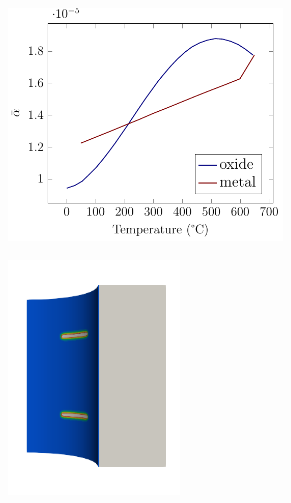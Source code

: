 \begin{frame}
\begin{columns}[T]
\begin{column}{0.6\textwidth}
\begin{figure}
{          \begin{subfigure}{0.4\textwidth}
            \centering
            \includegraphics[width=0.8\textwidth]{Chapter345/figures/CTE}
          \end{subfigure}
          \begin{subfigure}{0.4\textwidth}
            \centering
            \includegraphics[width=0.5\textwidth]{Chapter345/figures/seed_d_1}
          \end{subfigure}
          
}
\end{figure}
\end{column}
\end{columns}
\end{frame}
